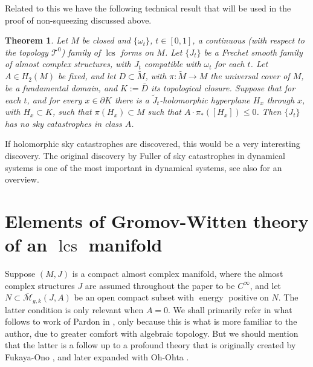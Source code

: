 \documentclass{amsart}
\numberwithin{equation}{section}
\newtheorem{theorem}[equation]{Theorem}
\theoremstyle{definition}
\theoremstyle{remark}
\DeclareMathOperator {\energy} {energy}
\DeclareMathOperator{\image}{\mathrm{image}}
\DeclareMathOperator{\lcs}{lcs}
\begin{document}
Related to this we have the following technical result that will be used in the proof of non-squeezing discussed above.   %
\begin{theorem} \label{thm:noSkycatastrophe} Let $M$ be closed and $\{\omega _{t} \}$, $t \in [0,1]$, a continuous (with respect to the topology $\mathcal{T} ^{0} $) family of $\lcs$ forms on $M$. Let $\{J _{t} \}$ be a Frechet smooth family of almost complex structures, with $J _{t} $ compatible with $\omega _{t} $ for each $t$.
Let $A \in H _{2} (M) $ be fixed,
and let $D \subset \widetilde{M} $, with $\pi: \widetilde{M} \to  M$ the universal cover of $M$, be a fundamental domain, and $K:= \overline {D}$  its topological closure.
   Suppose that for each $t$, and for every  $x \in \partial K$ there is a $\widetilde{J} _{t} $-holomorphic hyperplane $H _{x} $ through $x$, with $H _{x} \subset K $,  such that $\pi (H _{x}) \subset M$  such that $A \cdot \pi_*([H _{x}]) \leq 0$.
Then $\{J _{t} \}$ has no sky catastrophes in class $A$. 
\end{theorem}

If holomorphic sky catastrophes are discovered, this would be a very  interesting  discovery.  The original discovery by Fuller \cite{citeFullerBlueSky} of sky catastrophes in dynamical systems is one of the most important in dynamical systems, see also \cite{citeShilnikovTuraevBlueSky} for an overview.


\section {Elements of Gromov-Witten theory of an $\lcs$ manifold} \label{sec:elements}
Suppose $(M,J)$ is a compact almost complex manifold, where the almost complex structures $J$ are assumed throughout the paper to be $C ^{\infty} $, and let 
   $N \subset
\overline{\mathcal{M}} _{g,k}   (J,
A) $ be an open compact subset with $\energy$ positive on $N$. The latter condition is only relevant when $A =0$.  
 We shall primarily refer in what follows to work of Pardon in \cite{citePardonAlgebraicApproach}, only because this is what is more familiar to the author, due to greater comfort with algebraic topology.
But we should mention that the latter is a follow up to a profound theory that is originally created by Fukaya-Ono \cite{citeFukayaOnoArnoldandGW}, and later expanded with Oh-Ohta \cite{citeFukayaLagrangianIntersectionFloertheoryAnomalyandObstructionIandII}.
\end{document}
